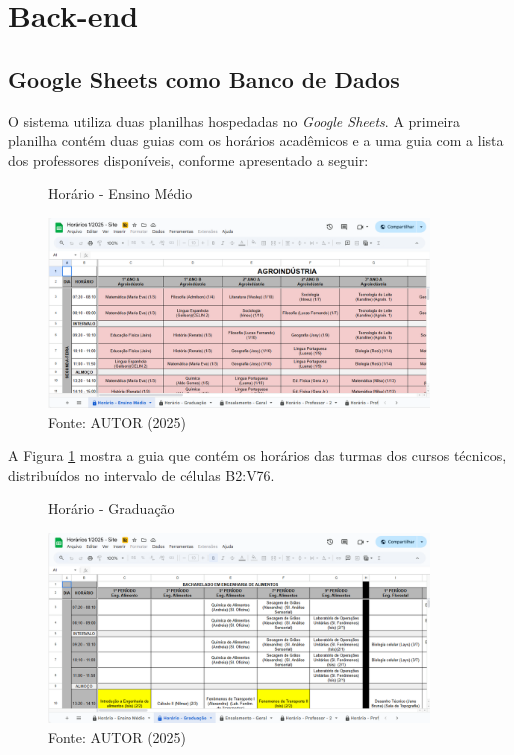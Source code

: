 \section{Back-end}

\subsection{Google Sheets como Banco de Dados}

O sistema utiliza duas planilhas hospedadas no \textit{Google Sheets}. A primeira planilha contém duas guias com os horários acadêmicos e a uma guia com a lista dos professores disponíveis, conforme apresentado a seguir:

\begin{figure}[htb]
    \centering
    \caption{Horário - Ensino Médio}
    \includegraphics[width=0.9\textwidth]{Figuras/plan-1.png}
    \caption*{Fonte: AUTOR (2025)}
    \label{fig_plan_1}
\end{figure}

A Figura \ref{fig_plan_1} mostra a guia que contém os horários das turmas dos cursos técnicos, distribuídos no intervalo de células B2:V76.

\begin{figure}[htb]
    \centering
    \caption{Horário - Graduação}
    \includegraphics[width=0.9\textwidth]{Figuras/plan-2.png}
    \caption*{Fonte: AUTOR (2025)}
    \label{fig_plan_2}
\end{figure}


